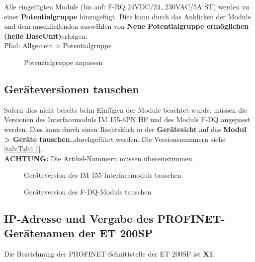 Alle eingefügten Module (bis auf: F-RQ 24VDC/24…230VAC/5A ST) werden zu einer \textbf{Potentialgruppe} hinzugefügt. Dies kann durch das Anklicken der Module und dem anschließenden auswählen von \glqq\textbf{Neue Potentialgruppe ermöglichen (helle BaseUnit)}\grqq\:erfolgen.\\
Pfad: Allgemein > Potentialgruppe

\begin{figure}[H]
   \centering
   \caption[Potenzialgruppe anpassen]{Potenzialgruppe anpassen}
   \label{fig:Bild4.5}
\end{figure}

\subsection{Geräteversionen tauschen}
Sofern dies nicht bereits beim Einfügen der Module beachtet wurde, müssen die Versionen des Interfacemoduls IM 155-6PN HF und des Moduls F-DQ angepasst werden. Dies kann durch einen Rechtsklick in der \textbf{Gerätesicht} auf das \glqq\textbf{Modul > Geräte tauschen..}\grqq\:durchgeführt werden. Die Versionsnummern siehe \autoref{tab:Tab4.1}. \\
\textbf{ACHTUNG:} Die Artikel-Nummern müssen übereinstimmen.

\begin{figure}[H]
   \centering
   \caption[Geräteversion des IM 155-Interfacemoduls tauschen]{Geräteversion des IM 155-Interfacemoduls tauschen}
   \label{fig:Bild4.6}
\end{figure}

\begin{figure}[H]
   \centering
   \caption[Geräteversion des F-DQ-Moduls tauschen]{Geräteversion des F-DQ-Moduls tauschen}
   \label{fig:Bild4.7}
\end{figure}

\subsection{IP-Adresse und Vergabe des PROFINET-Gerätenamen der ET 200SP} \label{sec: IP-Adresse_PROFINET-Gerätename_ET_200SP}
Die Bezeichnung der PROFINET-Schnittstelle der ET 200SP ist \textbf{X1}.

